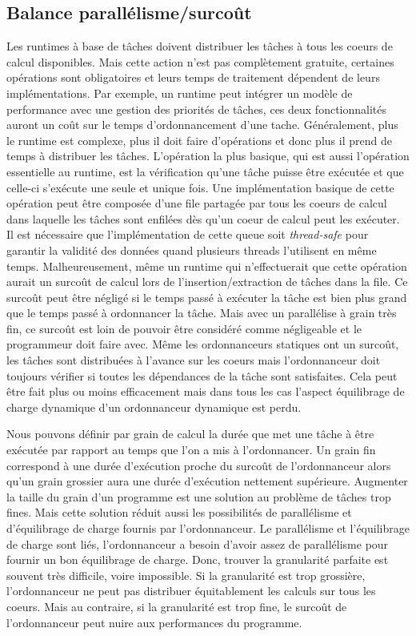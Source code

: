 \subsection{Balance parallélisme/surcoût}
Les runtimes à base de tâches doivent distribuer les tâches à tous les coeurs de calcul disponibles.
%
Mais cette action n'est pas complètement gratuite, certaines opérations sont obligatoires et leurs temps de traitement dépendent de leurs implémentations.
%
Par exemple, un runtime peut intégrer un modèle de performance avec une gestion des priorités de tâches, ces deux fonctionnalités auront un coût sur le temps d'ordonnancement d'une tache.
%
Généralement, plus le runtime est complexe, plus il doit faire d'opérations et donc plus il prend de temps à distribuer les tâches.
%
L'opération la plus basique, qui est aussi l'opération essentielle au runtime, est la vérification qu'une tâche puisse être exécutée et que celle-ci s'exécute une seule et unique fois.
%
Une implémentation basique de cette opération peut être composée d'une file partagée par tous les coeurs de calcul dans laquelle les tâches sont enfilées dès qu'un coeur de calcul peut les exécuter.
%
Il est nécessaire que l'implémentation de cette queue soit {\em thread-safe} pour garantir la validité des données quand plusieurs threads l'utilisent en même temps.
%
Malheureusement, même un runtime qui n'effectuerait que cette opération aurait un surcoût de calcul lors de l'insertion/extraction de tâches dans la file.
%
Ce surcoût peut être négligé si le temps passé à exécuter la tâche est bien plus grand que le temps passé à ordonnancer la tâche.
%
Mais avec un parallélise à grain très fin, ce surcoût est loin de pouvoir être considéré comme négligeable et le programmeur doit faire avec.
%
Même les ordonnanceurs statiques ont un surcoût, les tâches sont distribuées à l'avance sur les coeurs mais l'ordonnanceur doit toujours vérifier si toutes les dépendances de la tâche sont satisfaites.
%
Cela peut être fait plus ou moins efficacement mais dans tous les cas l'aspect équilibrage de charge dynamique d'un ordonnanceur dynamique est perdu\cite{static_sched}.


Nous pouvons définir par grain de calcul la durée que met une tâche à être exécutée par rapport au temps que l'on a mis à l'ordonnancer.
%
Un grain fin correspond à une durée d'exécution proche du surcoût de l'ordonnanceur alors qu'un grain grossier aura une durée d'exécution nettement supérieure.
%
Augmenter la taille du grain d'un programme est une solution au problème de tâches trop fines.
%
Mais cette solution réduit aussi les possibilités de parallélisme et d'équilibrage de charge fournis par l'ordonnanceur.
%
Le parallélisme et l'équilibrage de charge sont liés, l'ordonnanceur a besoin d'avoir assez de parallélisme pour fournir un bon équilibrage de charge.
%
Donc, trouver la granularité parfaite est souvent très difficile, voire impossible.
%
Si la granularité est trop grossière, l'ordonnanceur ne peut pas distribuer équitablement les calculs sur tous les coeurs.
%
Mais au contraire, si la granularité est trop fine, le surcoût de l'ordonnanceur peut nuire aux performances du programme.


